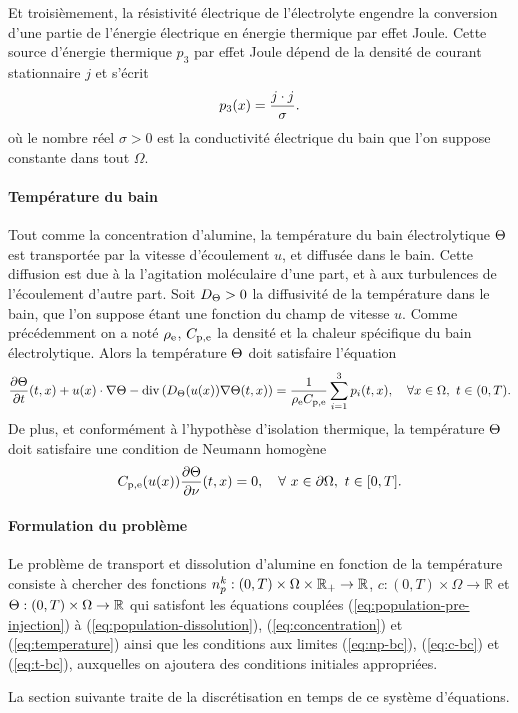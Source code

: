 Et troisièmement, la résistivité électrique de l'électrolyte engendre
la conversion d'une partie de l'énergie électrique en énergie
thermique par effet Joule. Cette source d'énergie thermique $p_3$ par
effet Joule dépend de la densité de courant stationnaire $j$ et
s'écrit
\begin{equation}\label{eq:p3}
p_3(x) = \frac{j\cdot j}{\sigma}.
\end{equation}
où le nombre réel $\sigma > 0$ est la conductivité électrique du bain que l'on
suppose constante dans tout $\Omega$.

\paragraph{Température du bain}
Tout comme la concentration d'alumine, la température du bain
électrolytique $\Theta$ est transportée par la vitesse
d'écoulement $u$, et diffusée dans le bain. Cette diffusion est due à
la l'agitation moléculaire d'une part, et à aux turbulences de
l'écoulement d'autre part. Soit $D_\Theta > 0$ la diffusivité
de la température dans le bain, que l'on suppose étant une fonction
du champ de vitesse $u$. Comme précédemment on a noté $\rho_\mathrm{e}$,
$C_{\mathrm{p,e}}$ la densité et la chaleur spécifique du bain
électrolytique. Alors la température $\Theta$ doit satisfaire
l'équation
\begin{equation}\label{eq:temperature}
\frac{\partial \Theta}{\partial t}(t, x) +
u(x)\cdot\nabla\Theta - \mathrm{div}\left( D_\Theta(u(x))\nabla
\Theta(t, x) \right) =
\frac{1}{\rho_\mathrm{e}C_{\mathrm{p,e}}}\sum_{i = 1}^{3}p_i(t, x),
\quad \forall x\in\Omega,\ t\in(0, T).
\end{equation}
De plus, et conformément à l'hypothèse d'isolation thermique, la température
$\Theta$ doit satisfaire une condition de Neumann homogène
\begin{equation}\label{eq:t-bc}
  C_{\mathrm{p,e}}(u(x))\frac{\partial \Theta}{\partial \nu}(t, x) = 0, \quad
  \forall\ x\in\partial \Omega,\ t\in[0, T].
\end{equation}

\paragraph{Formulation du problème}
Le problème de transport et dissolution d'alumine en fonction de la
température consiste à chercher des fonctions $n_p^k:(0,
T)\times\Omega\times{\mathbb R_+}\to \mathbb R$, $c:(0, T)\times\Omega\to
\mathbb R$ et $\Theta:(0, T)\times\Omega\to\mathbb R$ qui
satisfont les équations couplées (\ref{eq:population-pre-injection}) à
(\ref{eq:population-dissolution}), (\ref{eq:concentration}) et
(\ref{eq:temperature}) ainsi que les conditions aux limites
(\ref{eq:np-bc}), (\ref{eq:c-bc}) et (\ref{eq:t-bc}), auxquelles on
ajoutera des conditions initiales appropriées.

La section suivante traite de la discrétisation en temps de ce
système d'équations.
